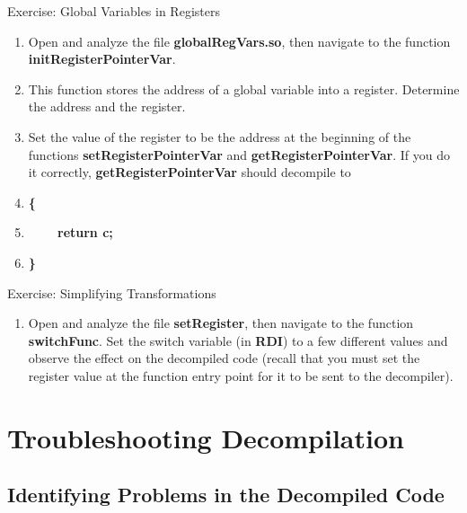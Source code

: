 \documentclass{beamer}
\begin{document}
\begin{frame}
\begin{block}{Exercise: Global Variables in Registers}
\begin{enumerate}
\item Open and analyze the file \textbf{globalRegVars.so}, then navigate to the function \textbf{initRegisterPointerVar}.  
\item This function stores the address of a global variable into a register.  Determine the address and the register.
\item Set the value of the register to be the address at the beginning of the functions \textbf{setRegisterPointerVar} and \textbf{getRegisterPointerVar}. If you do it correctly,
\textbf{getRegisterPointerVar} should decompile to 
\item[]\textbf{\{}
\item[]\textbf{~~~~return c;}
\item[]\textbf{\}}
\end{enumerate}
\end{block}
\end{frame}

\begin{frame}
\begin{block}{Exercise: Simplifying Transformations}
\begin{enumerate}
\item Open and analyze the file \textbf{setRegister}, then navigate to the function \textbf{switchFunc}.  Set the switch variable (in \textbf{RDI}) to a few 
different values and observe the effect on the decompiled code (recall that you must set the register value at the function entry point for it to be sent
to the decompiler).
\end{enumerate}
\end{block}
\end{frame}


\section{Troubleshooting Decompilation}

\subsection{Identifying Problems in the Decompiled Code}
\end{document}

